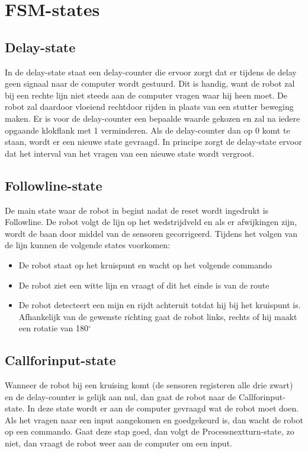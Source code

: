 \documentclass{report}
\begin{document}
\section{FSM-states}

\subsection{Delay-state}
In de delay-state staat een delay-counter die ervoor zorgt dat er tijdens de delay geen signaal naar de computer wordt gestuurd.
Dit is handig, want de robot zal bij een rechte lijn niet steeds aan de computer vragen waar hij heen moet.
De robot zal daardoor vloeiend rechtdoor rijden in plaats van een stutter beweging maken.
Er is voor de delay-counter een bepaalde waarde gekozen en zal na iedere opgaande klokflank met 1 verminderen.
Als de delay-counter dan op 0 komt te staan, wordt er een nieuwe state gevraagd.
In principe zorgt de delay-state ervoor dat het interval van het vragen van een nieuwe state wordt vergroot.

\subsection{Followline-state}
De main state waar de robot in begint nadat de reset wordt ingedrukt is Followline.
De robot volgt de lijn op het wedstrijdveld en als er afwijkingen zijn, wordt de baan door middel van de sensoren gecorrigeerd.
Tijdens het volgen van de lijn kunnen de volgende states voorkomen: 
\begin{itemize}
\item De robot staat op het kruispunt en wacht op het volgende commando
\item De robot ziet een witte lijn en vraagt of dit het einde is van de route
\item De robot detecteert een mijn en rijdt achteruit totdat hij bij het kruispunt is. Afhankelijk van de gewenste richting gaat de robot links, rechts of hij maakt een rotatie van 180$^\circ$
\end{itemize}

\subsection{Callforinput-state}
Wanneer de robot bij een kruising komt (de sensoren registeren alle drie zwart) en de delay-counter is gelijk aan nul, dan gaat de robot naar de Callforinput-state.
In deze state wordt er aan de computer gevraagd wat de robot moet doen.
Als het vragen naar een input aangekomen en goedgekeurd is, dan wacht de robot op een commando.
Gaat deze stap goed, dan volgt de Processnextturn-state, zo niet, dan vraagt de robot weer aan de computer om een input.
\end{document}
